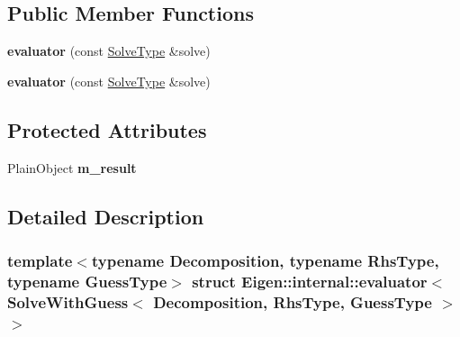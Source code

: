 \subsection*{Public Member Functions}
\begin{DoxyCompactItemize}
\item 
\mbox{\label{struct_eigen_1_1internal_1_1evaluator_3_01_solve_with_guess_3_01_decomposition_00_01_rhs_type_00_01_guess_type_01_4_01_4_a767caca47bbafe10dd98680f780f7959}} 
{\bfseries evaluator} (const \hyperlink{group___iterative_linear_solvers___module_class_eigen_1_1_solve_with_guess}{Solve\+Type} \&solve)
\item 
\mbox{\label{struct_eigen_1_1internal_1_1evaluator_3_01_solve_with_guess_3_01_decomposition_00_01_rhs_type_00_01_guess_type_01_4_01_4_a767caca47bbafe10dd98680f780f7959}} 
{\bfseries evaluator} (const \hyperlink{group___iterative_linear_solvers___module_class_eigen_1_1_solve_with_guess}{Solve\+Type} \&solve)
\end{DoxyCompactItemize}
\subsection*{Protected Attributes}
\begin{DoxyCompactItemize}
\item 
\mbox{\label{struct_eigen_1_1internal_1_1evaluator_3_01_solve_with_guess_3_01_decomposition_00_01_rhs_type_00_01_guess_type_01_4_01_4_aff64883b1bb7c107c0ed28c6755b9772}} 
Plain\+Object {\bfseries m\+\_\+result}
\end{DoxyCompactItemize}


\subsection{Detailed Description}
\subsubsection*{template$<$typename Decomposition, typename Rhs\+Type, typename Guess\+Type$>$\newline
struct Eigen\+::internal\+::evaluator$<$ Solve\+With\+Guess$<$ Decomposition, Rhs\+Type, Guess\+Type $>$ $>$}



